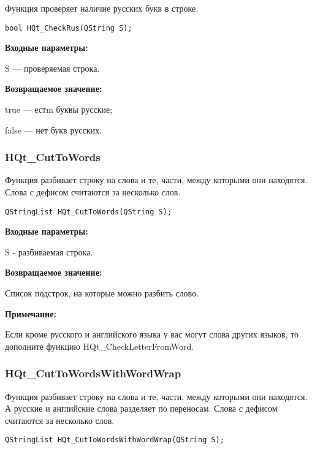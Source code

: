 \documentclass[a4paper,12pt]{article}
\begin{document}
Функция проверяет наличие русских букв в строке.


\begin{lstlisting}[label=code_syntax_HQt_CheckRus,caption=Синтаксис]
bool HQt_CheckRus(QString S);
\end{lstlisting}

\textbf{Входные параметры:}

S --- проверяемая строка.

\textbf{Возвращаемое значение:}
 
true --- естm буквы русские;
 
    false --- нет букв русских.


\subsubsection{HQt\_CutToWords}\label{HQt_CutToWords}

Функция разбивает строку на слова и те, части, между которыми они находятся. Слова с дефисом считаются за несколько слов.


\begin{lstlisting}[label=code_syntax_HQt_CutToWords,caption=Синтаксис]
QStringList HQt_CutToWords(QString S);
\end{lstlisting}

\textbf{Входные параметры:}

S - разбиваемая строка.

\textbf{Возвращаемое значение:}
 
Список подстрок, на которые можно разбить слово.

\textbf{Примечание:}

     Если кроме русского и английского языка у вас могут слова других языков, то дополните функцию HQt\_CheckLetterFromWord.


\subsubsection{HQt\_CutToWordsWithWordWrap}\label{HQt_CutToWordsWithWordWrap}

Функция разбивает строку на слова и те, части, между которыми они находятся. А русские и английские слова разделяет по переносам. Слова с дефисом считаются за несколько слов.


\begin{lstlisting}[label=code_syntax_HQt_CutToWordsWithWordWrap,caption=Синтаксис]
QStringList HQt_CutToWordsWithWordWrap(QString S);
\end{lstlisting}
\end{document}
